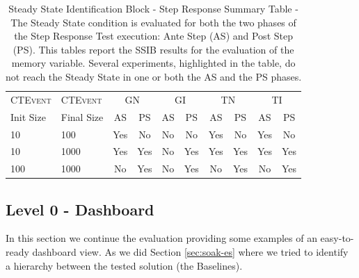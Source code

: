 \begin{table}[h]
\centering
\scriptsize
\begin{tabular}{ll|c|c|c|c|c|c|c|c}
\hline
\textsc{CTEvent}&\textsc{CTEvent}&\multicolumn{2}{c|}{GN}& \multicolumn{2}{c|}{GI}& \multicolumn{2}{c|}{TN}& \multicolumn{2}{c}{TI} \\
 Init Size & Final Size & AS& PS& AS& PS& AS& PS& AS & PS\\ 
\hline
\hline
10 & 100 & Yes& \cellcolor[HTML]{C0C0C0}No & \cellcolor[HTML]{C0C0C0}No & \cellcolor[HTML]{C0C0C0}No & Yes& \cellcolor[HTML]{C0C0C0}No & \cellcolor[HTML]{FFFFFF}Yes & \cellcolor[HTML]{C0C0C0}No \\ 
10 & 1000& Yes& Yes& \cellcolor[HTML]{C0C0C0}No & Yes& Yes& Yes& Yes& Yes\\ 
100& 1000& \cellcolor[HTML]{C0C0C0}No & Yes& \cellcolor[HTML]{C0C0C0}No & Yes& \cellcolor[HTML]{C0C0C0}No & Yes& \cellcolor[HTML]{C0C0C0}No  & Yes\\ 
\hline
\end{tabular}
\caption[Steady State Identification Block - Step Response Summary Table - Memory]{Steady State Identification Block - Step Response Summary Table - The Steady State condition is evaluated for both the two phases of the Step Response Test execution: Ante Step (AS) and Post Step (PS). This tables report the SSIB results for the evaluation of the memory variable. Several experiments, highlighted in the table, do not reach the Steady State in one or both the AS and the PS phases.}
\label{tab:ss-step-memory}
\end{table}

\subsection{Level 0 - Dashboard}\label{sec:level0-step-dashboard}

In this section we continue the evaluation providing some examples of an easy-to-ready dashboard view. As we did Section \ref{sec:soak-es} where we tried to identify a hierarchy between the tested solution (the Baselines). 

